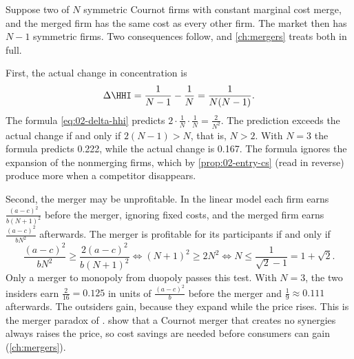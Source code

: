 \begin{remark}\label{rem:02-cournot-merger}
Suppose two of $N$ symmetric Cournot firms with constant marginal cost merge, and the merged firm has the same cost
as every other firm. The market then has $N - 1$ symmetric firms. Two consequences follow, and \cref{ch:mergers}
treats both in full.

First, the actual change in concentration is
\[
  \Delta\HHI = \frac{1}{N - 1} - \frac{1}{N} = \frac{1}{N(N - 1)} .
\]
The formula \eqref{eq:02-delta-hhi} predicts $2\cdot\frac{1}{N}\cdot\frac{1}{N} = \frac{2}{N^2}$. The prediction
exceeds the actual change if and only if $2(N - 1) > N$, that is, $N > 2$. With $N = 3$ the formula predicts 0.222,
while the actual change is 0.167. The formula ignores the expansion of the nonmerging firms, which by
\cref{prop:02-entry-cs} (read in reverse) produce more when a competitor disappears.

Second, the merger may be unprofitable. In the linear model each firm earns $\frac{(a - c)^2}{b(N + 1)^2}$ before the
merger, ignoring fixed costs, and the merged firm earns $\frac{(a - c)^2}{bN^2}$ afterwards. The merger is profitable
for its participants if and only if
\[
  \frac{(a - c)^2}{bN^2} \ge \frac{2(a - c)^2}{b(N + 1)^2}
  \iff (N + 1)^2 \ge 2N^2 \iff N \le \frac{1}{\sqrt{2} - 1} = 1 + \sqrt{2} .
\]
Only a merger to monopoly from duopoly passes this test. With $N = 3$, the two insiders earn $\frac{2}{16} = 0.125$
in units of $\frac{(a - c)^2}{b}$ before the merger and $\frac{1}{9} \approx 0.111$ afterwards. The outsiders gain,
because they expand while the price rises. This is the merger paradox of \citet{SalantSwitzerReynolds1983}.
\citet{FarrellShapiro1990} show that a Cournot merger that creates no synergies always raises the price, so cost
savings are needed before consumers can gain (\cref{ch:mergers}).
\end{remark}
